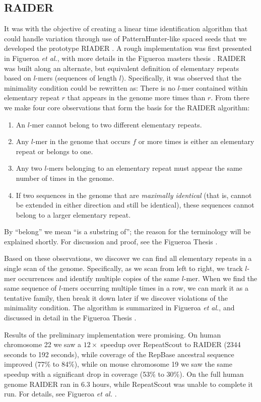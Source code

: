 \documentclass{bmcart}
\begin{document}
\subsection*{RAIDER}
\label{RAIDERSec}
It was with the objective of creating a linear time identification
algorithm that could handle variation through use of
PatternHunter-like spaced seeds that we developed the prototype RIADER
\cite{Li:2004wl}.  A rough implementation was first presented in
Figueroa {\it et al.}, with more details in the Figueroa masters
thesis \cite{Figueroa:2014uk,Figueroa:2013cz}.  RAIDER was built along an
alternate, but equivalent definition of elementary repeats based on
$l$-mers (sequences of length $l$).  Specifically, it was observed
that the minimality condition could be rewritten as: 
There is no $l$-mer contained within elementary repeat $r$ that appears in the genome
more times than $r$.  From there we make four core observations that form
the basis for the RAIDER algorithm:
\begin{enumerate}
\item An $l$-mer cannot belong to two different elementary repeats.
\item Any $l$-mer in the genome that occurs $f$ or more times is
  either an elementary repeat or belongs to one.
\item Any two $l$-mers belonging to an elementary repeat must appear
  the same number of times in the genome. 
\item If two sequences in the genome that are {\it maximally
  identical} (that is, cannot be extended in either direction and still
  be identical), these sequences cannot belong to a larger
  elementary repeat.
\end{enumerate}
By ``belong'' we mean ``is a substring of''; the reason for the
terminology will be explained shortly.  For discussion and proof, see
the Figueroa Thesis \cite{Figueroa:2013cz}. 

Based on these observations, we discover we can find all elementary
repeats in a single scan of the genome.  Specifically, as we scan from
left to right, we track $l$-mer occurrences and identify multiple
copies of the same $l$-mer.  When we find the same sequence of $l$-mers
occurring multiple times in a row, we can mark it as a tentative family,
then break it down later if we discover violations of the minimality
condition.  The algorithm is summarized in Figueroa {\it et al.}, and
discussed in detail in the Figueroa Thesis \cite{Figueroa:2014uk,Figueroa:2013cz}.

Results of the preliminary implementation were promising. On human
chromosome 22 we saw a $12\times$ speedup over RepeatScout to RAIDER
(2344 seconds to 192 seconds), while coverage of the RepBase
\cite{Jurka:2005bl} ancestral sequence improved (77\% to 84\%), while
on mouse chromosome 19 we saw the same speedup with a significant drop
in coverage (53\% to 30\%).  On the full human genome RAIDER ran in
$6.3$ hours, while RepeatScout was unable to complete it run.  For
details, see Figueroa {\it et al.} \cite{Figueroa:2014uk}.
\end{document}
